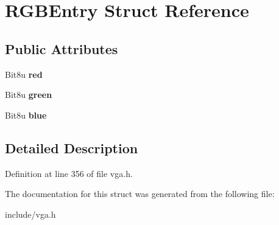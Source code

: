 \hypertarget{structRGBEntry}{\section{R\-G\-B\-Entry Struct Reference}
\label{structRGBEntry}
}
\subsection*{Public Attributes}
\begin{DoxyCompactItemize}
\item 
\hypertarget{structRGBEntry_a51c517e90d0d1bab872e5fdee34a60bc}{Bit8u {\bfseries red}}\label{structRGBEntry_a51c517e90d0d1bab872e5fdee34a60bc}

\item 
\hypertarget{structRGBEntry_adc6713003c2ad77cc873d56e74135362}{Bit8u {\bfseries green}}\label{structRGBEntry_adc6713003c2ad77cc873d56e74135362}

\item 
\hypertarget{structRGBEntry_a96944c8a46f4ae70ec99e8e33d117627}{Bit8u {\bfseries blue}}\label{structRGBEntry_a96944c8a46f4ae70ec99e8e33d117627}

\end{DoxyCompactItemize}


\subsection{Detailed Description}


Definition at line 356 of file vga.\-h.



The documentation for this struct was generated from the following file\-:\begin{DoxyCompactItemize}
\item 
include/vga.\-h\end{DoxyCompactItemize}
